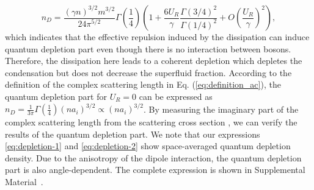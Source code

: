 \documentclass[aps,prl,twocolumn,superscriptaddress,]{revtex4-1}
\begin{document}
\begin{equation}\label{eq:depletion-2}
n_{D}=\frac{(\gamma n)^{3/2}m^{3/2}}{24\pi^{5/2}}\Gamma\left(\frac{1}{4}\right)\left(1+\frac{6U_{R}}{\gamma}\frac{\Gamma(3/4)^{2}}{\Gamma(1/4)^{2}}+O\left(\frac{U_{R}}{\gamma}\right)^{2}\right),
\end{equation}
which indicates that the effective repulsion induced by the dissipation
can induce quantum depletion part even though there is no interaction
between bosons. Therefore, the dissipation here leads to a coherent depletion which depletes the condensation but does not decrease the superfluid fraction.
According to the definition of the complex scattering
length in Eq. (\ref{eq:definition_ac}), the quantum depletion part for
$U_{R}=0$ can be expressed as $n_{D}=\frac{1}{3\pi}\Gamma\left(\frac{1}{4}\right)(na_{i})^{3/2}\propto(na_{i})^{3/2}$. By measuring the imaginary part of the complex scattering length from
the scattering cross section \citep{PhysRevC.90.064004,PhysRevD.38.742,PhysRevA.78.023608},
we can verify the results of the quantum depletion part. We note that our expressions \eqref{eq:depletion-1} and \eqref{eq:depletion-2} show space-averaged quantum depletion density. Due to the anisotropy of the dipole interaction, the quantum depletion part is also angle-dependent. The complete expression is shown in Supplemental Material~\cite{SupplementaryMaterial}. 

\
 \
\end{document}

